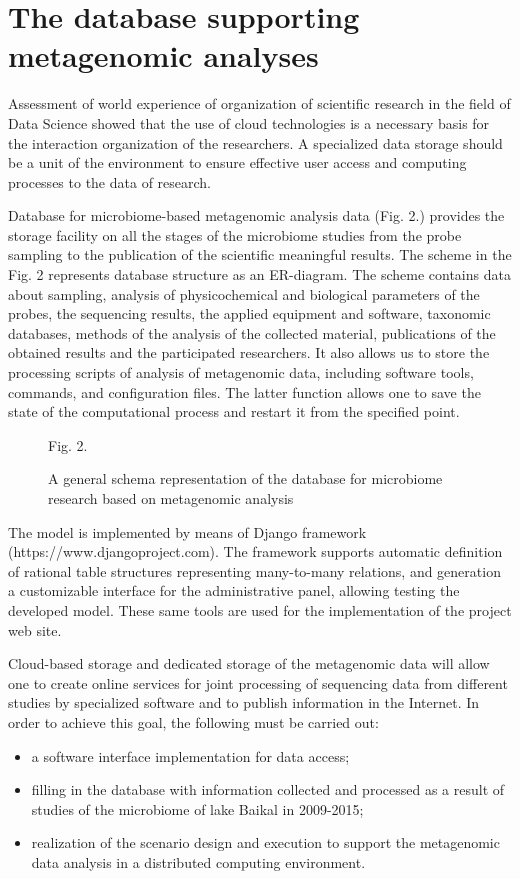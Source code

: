 \documentclass[conference,a4paper]{IEEEtran}
\begin{document}
\section{The database supporting metagenomic analyses}
\label{sec:dbsupp}

Assessment of world experience of organization of scientific research in the field of Data Science showed that the use of cloud technologies is a necessary basis for the interaction organization of the researchers. A specialized data storage should be a unit of the environment to ensure effective user access and computing processes to the data of research.

Database for microbiome-based metagenomic analysis data (Fig. 2.) provides the storage facility on all the stages of the microbiome studies from the probe sampling to the publication of the scientific meaningful results. The scheme in the Fig. 2 represents database structure as an ER-diagram. The scheme contains data about sampling, analysis of physicochemical and biological parameters of the probes, the sequencing results, the applied equipment and software, taxonomic databases, methods of the analysis of the collected material, publications of the obtained results and the participated researchers. It also allows us to store the processing scripts of analysis of metagenomic data, including software tools, commands, and configuration files. The latter function allows one to save the state of the computational process and restart it from the specified point.

\begin{figure}[t]\centering
Fig. 2. \caption{A general schema representation of the database for microbiome research based on metagenomic analysis}
\end{figure}

The model is implemented by means of Django framework (https://www.djangoproject.com). The framework supports automatic definition of rational table structures representing many-to-many relations, and generation a customizable interface for the administrative panel, allowing testing the developed model. These same tools are used for the implementation of the project web site.

Cloud-based storage and dedicated storage of the metagenomic data will allow one to create online services for joint processing of sequencing data from different studies by specialized software and to publish information in the Internet. In order to achieve this goal, the following must be carried out:
\begin{itemize}
\item a software interface implementation for data access;
\item filling in the database with information collected and processed as a result of studies of the microbiome of lake Baikal in 2009-2015;
\item realization of the scenario design and execution to support the metagenomic data analysis in a distributed computing environment.
\end{itemize}
\end{document}
